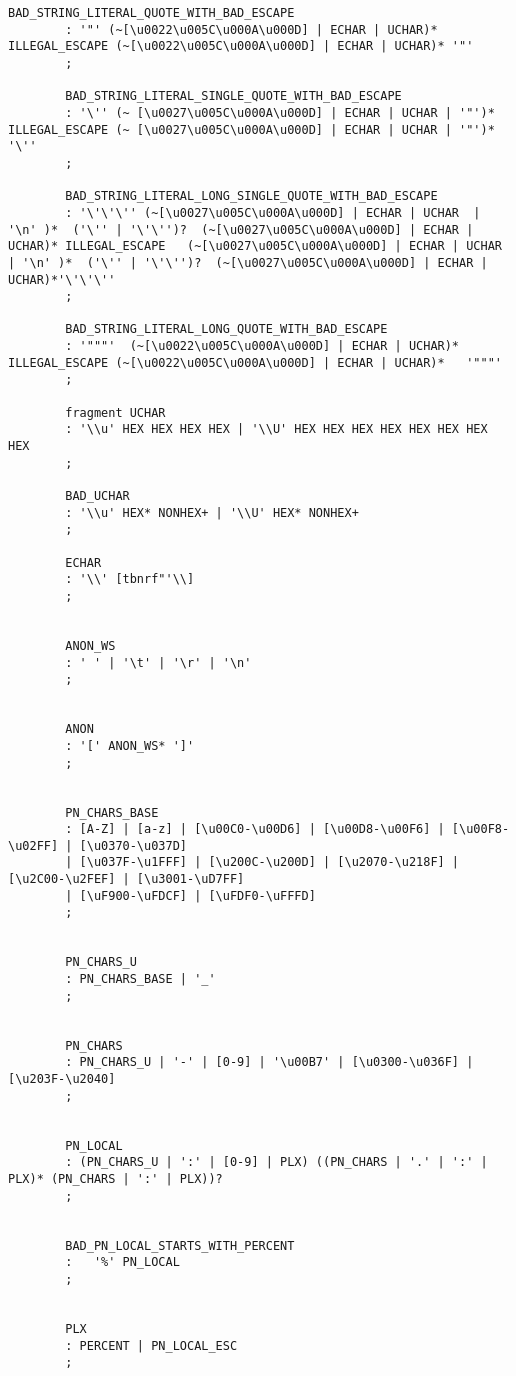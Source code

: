 \begin{appendices}
\begin{lstlisting}[breaklines,basicstyle=\ttfamily]
		BAD_STRING_LITERAL_QUOTE_WITH_BAD_ESCAPE
		: '"' (~[\u0022\u005C\u000A\u000D] | ECHAR | UCHAR)* ILLEGAL_ESCAPE (~[\u0022\u005C\u000A\u000D] | ECHAR | UCHAR)* '"' 
		;
		
		BAD_STRING_LITERAL_SINGLE_QUOTE_WITH_BAD_ESCAPE
		: '\'' (~ [\u0027\u005C\u000A\u000D] | ECHAR | UCHAR | '"')*  ILLEGAL_ESCAPE (~ [\u0027\u005C\u000A\u000D] | ECHAR | UCHAR | '"')*  '\''
		;
		
		BAD_STRING_LITERAL_LONG_SINGLE_QUOTE_WITH_BAD_ESCAPE
		: '\'\'\'' (~[\u0027\u005C\u000A\u000D] | ECHAR | UCHAR  | '\n' )*  ('\'' | '\'\'')?  (~[\u0027\u005C\u000A\u000D] | ECHAR | UCHAR)* ILLEGAL_ESCAPE   (~[\u0027\u005C\u000A\u000D] | ECHAR | UCHAR  | '\n' )*  ('\'' | '\'\'')?  (~[\u0027\u005C\u000A\u000D] | ECHAR | UCHAR)*'\'\'\''  
		;
		
		BAD_STRING_LITERAL_LONG_QUOTE_WITH_BAD_ESCAPE
		: '"""'  (~[\u0022\u005C\u000A\u000D] | ECHAR | UCHAR)*   ILLEGAL_ESCAPE (~[\u0022\u005C\u000A\u000D] | ECHAR | UCHAR)*   '"""'
		;
		
		fragment UCHAR
		: '\\u' HEX HEX HEX HEX | '\\U' HEX HEX HEX HEX HEX HEX HEX HEX
		;
		
		BAD_UCHAR
		: '\\u' HEX* NONHEX+ | '\\U' HEX* NONHEX+ 
		;
		
		ECHAR
		: '\\' [tbnrf"'\\]
		;
		
		
		ANON_WS
		: ' ' | '\t' | '\r' | '\n'
		;
		
		
		ANON
		: '[' ANON_WS* ']'
		;
		
		
		PN_CHARS_BASE
		: [A-Z] | [a-z] | [\u00C0-\u00D6] | [\u00D8-\u00F6] | [\u00F8-\u02FF] | [\u0370-\u037D]
		| [\u037F-\u1FFF] | [\u200C-\u200D] | [\u2070-\u218F] | [\u2C00-\u2FEF] | [\u3001-\uD7FF]
		| [\uF900-\uFDCF] | [\uFDF0-\uFFFD]				   		   
		;
		
		
		PN_CHARS_U
		: PN_CHARS_BASE | '_'
		;
		
		
		PN_CHARS
		: PN_CHARS_U | '-' | [0-9] | '\u00B7' | [\u0300-\u036F] | [\u203F-\u2040]
		;
		
		
		PN_LOCAL
		: (PN_CHARS_U | ':' | [0-9] | PLX) ((PN_CHARS | '.' | ':' | PLX)* (PN_CHARS | ':' | PLX))?
		;
		
		
		BAD_PN_LOCAL_STARTS_WITH_PERCENT
		:   '%' PN_LOCAL
		;
		
		
		PLX
		: PERCENT | PN_LOCAL_ESC
		;
		

\end{lstlisting}
\end{appendices}
